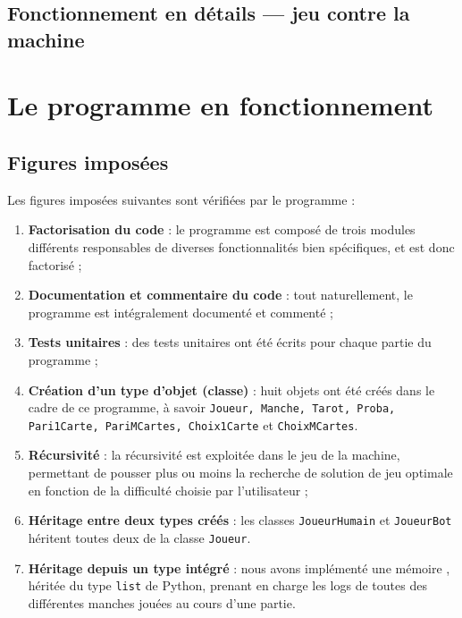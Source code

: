    \subsection{Fonctionnement en détails --- jeu contre la machine}\label{subsec:fonctionnement-en-détails-----jeu-contre-la-machine}


\section{Le programme en fonctionnement}\label{sec:le-programme-en-fonctionnement}

   \subsection{Figures imposées}\label{subsec:figures-imposées}
      Les figures imposées suivantes sont vérifiées par le programme :
      \begin{enumerate}
         \item \textbf{Factorisation du code} : le programme est composé de trois modules différents responsables de diverses fonctionnalités bien spécifiques, et est donc factorisé ;
         \item \textbf{Documentation et commentaire du code} : tout naturellement, le programme est intégralement documenté et commenté ;
         \item \textbf{Tests unitaires} : des tests unitaires ont été écrits pour chaque partie du programme ;
         \item \textbf{Création d'un type d'objet (classe)} : huit objets ont été créés dans le cadre de ce programme, à savoir \texttt{Joueur, Manche, Tarot, Proba, Pari1Carte, PariMCartes, Choix1Carte} et \texttt{ChoixMCartes}.
         \item \textbf{Récursivité} : la récursivité est exploitée dans le jeu de la machine, permettant de pousser plus ou moins la recherche de solution de jeu optimale en fonction de la difficulté choisie par l'utilisateur ;
         \item \textbf{Héritage entre deux types créés} : les classes \texttt{JoueurHumain} et \texttt{JoueurBot} héritent toutes deux de la classe \texttt{Joueur}.
         \item \textbf{Héritage depuis un type intégré} : nous avons implémenté une \og mémoire \fg{}, héritée du type \texttt{list} de Python, prenant en charge les logs de toutes des différentes manches jouées au cours d'une partie.
      \end{enumerate}

